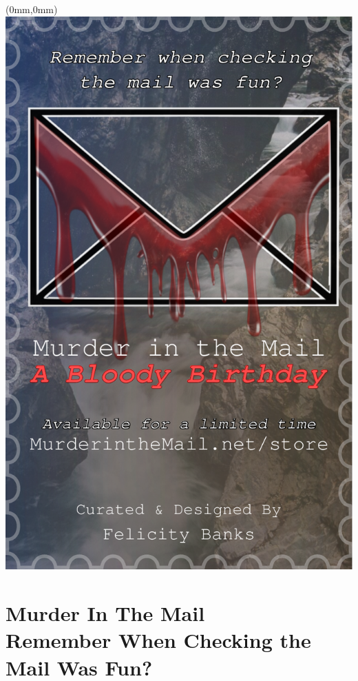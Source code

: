 \documentclass[11.75pt,openany,final]{memoir}
\begin{document}
\chapter*{}
\begin{textblock*}{70.9mm}(0mm,0mm)
  \includegraphics[width=\paperwidth]{./media/images/murder_ad}
\end{textblock*}
\chapter{Murder In The Mail\\ \small{Remember When Checking the Mail Was Fun?}}
\label{sec:murder}



% 

\end{document}
